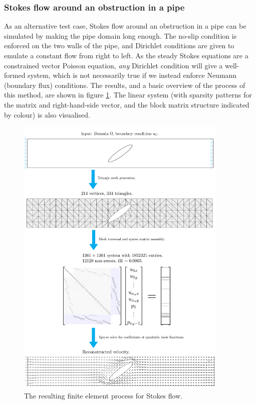 \subsubsection{Stokes flow around an obstruction in a pipe}
As an alternative test case, Stokes flow around an obstruction in a pipe can be simulated by making the pipe domain long enough.
The no-slip condition is enforced on
the two walls of the pipe, and Dirichlet conditions are given to emulate a constant flow from right to left. As the steady Stokes equations
are a constrained vector Poisson equation, \textit{any} Dirichlet condition will give a well-formed system, which is not necessarily true
if we instead enforce Neumann (boundary flux) conditions.
The results, and a basic overview of the process of this method, are shown in figure \ref{stokes_pipe}.
The linear system (with sparsity patterns for the matrix and right-hand-side vector, and the block matrix structure indicated by colour) is also visualised.
\begin{figure}[H]
    \centering
    \centerline{\includegraphics[width=0.9\textwidth]{figures/stokes/pipe/full.png}}
    \caption{The resulting finite element process for Stokes flow.
    }
    \label{stokes_pipe}
\end{figure}

